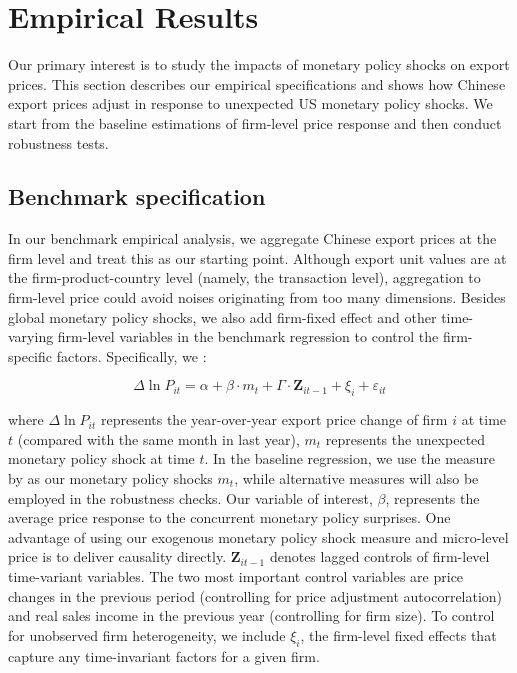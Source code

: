 \newpage
\section{Empirical Results}

Our primary interest is to study the impacts of monetary policy shocks on export prices. This section describes our empirical specifications and shows how Chinese export prices adjust in response to unexpected US monetary policy shocks. We start from the baseline estimations of firm-level price response and then conduct robustness tests.

\subsection{Benchmark specification}

In our benchmark empirical analysis, we aggregate Chinese export prices at the firm level and treat this as our starting point. Although export unit values are at the firm-product-country level (namely, the transaction level), aggregation to firm-level price could avoid noises originating from too many dimensions. Besides global monetary policy shocks, we also add firm-fixed effect and other time-varying firm-level variables in the benchmark regression to control the firm-specific factors. Specifically, we :

\begin{equation}
    \Delta \ln P_{it} = \alpha+\beta \cdot m_{t}+ \Gamma \cdot \textbf{Z}_{it-1}+\xi_{i}+\varepsilon_{it}
\end{equation}

\noindent where $\Delta \ln P_{it}$ represents the year-over-year export price change of firm $i$ at time $t$ (compared with the same month in last year), $m_t$ represents the unexpected monetary policy shock at time $t$. In the baseline regression, we use the measure by \cite{bu2021unified} as our monetary policy shocks $m_t$, while alternative measures will also be employed in the robustness checks. Our variable of interest, $\beta$, represents the average price response to the concurrent monetary policy surprises. One advantage of using our exogenous monetary policy shock measure and micro-level price is to deliver causality directly. $\textbf{Z}_{it-1}$ denotes lagged controls of firm-level time-variant variables. The two most important control variables are price changes in the previous period (controlling for price adjustment autocorrelation) and real sales income in the previous year (controlling for firm size). To control for unobserved firm heterogeneity, we include $\xi_{i}$, the firm-level fixed effects that capture any time-invariant factors for a given firm.

